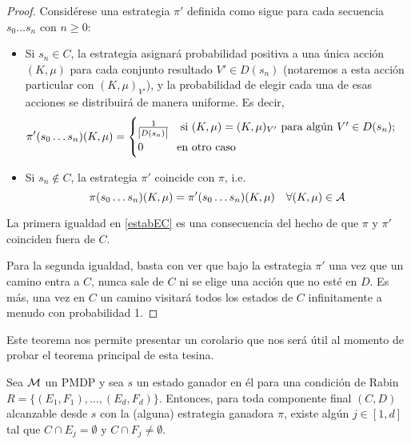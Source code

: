 \begin{proof}
	Considérese una estrategia $\pi'$ definida como sigue para cada secuencia $s_0 \dots s_n$ con $n \geq 0$:

	\begin{itemize}
		\item Si $s_n \in C$, la estrategia asignará probabilidad positiva a una única acción
		      $(K, \mu)$ para cada conjunto resultado $V' \in D(s_n)$ (notaremos a esta
		      acción particular con $(K, \mu)_{V'}$), y la probabilidad de elegir cada una de
		      esas acciones se distribuirá de manera uniforme. Es decir,
		      \[
			      \pi'(s_0 \dots s_n)(K, \mu) =
			      \begin{cases}
				      \frac{1}{\abs{D(s_n)}} \quad \text{si } (K, \mu) = (K, \mu)_{V'} \text{ para algún } V' \in D(s_n); \\
				      0 \qquad \quad \text{en otro caso}
			      \end{cases}
		      \]

		\item Si $s_n \notin C$, la estrategia $\pi'$ coincide con $\pi$, i.e.
		      \[
			      \pi(s_0 \dots s_n)(K, \mu) = \pi'(s_0\dots s_n)(K, \mu) \quad \forall (K, \mu) \in \mathcal{A}
		      \]

	\end{itemize}

	La primera igualdad en \ref{estabEC} es una consecuencia del hecho de que $\pi$
	y $\pi'$ coinciden fuera de $C$.

	Para la segunda igualdad, basta con ver que bajo la estrategia $\pi'$ una vez
	que un camino entra a $C$, nunca sale de $C$ ni se elige una acción que no esté
	en $D$. Es más, una vez en $C$ un camino visitará todos los estados de $C$
	infinitamente a menudo con probabilidad 1.
\end{proof}

Este teorema nos permite presentar un corolario que nos será útil al momento de
probar el teorema principal de esta tesina.

\begin{corollary}
	\label{adaptB30}
	Sea $\mathcal{M}$ un PMDP y sea $s$ un estado ganador en él para una condición de Rabin $R = \{(E_1, F_1), \dots, (E_d, F_d)\}$. %
	Entonces, para toda componente final $(C,D)$ alcanzable desde $s$ con la (alguna) estrategia ganadora $\pi$, existe algún $j \in [1, d]$ tal que $C \cap E_j= \emptyset$ y $C \cap F_j \neq \emptyset$.
\end{corollary}

